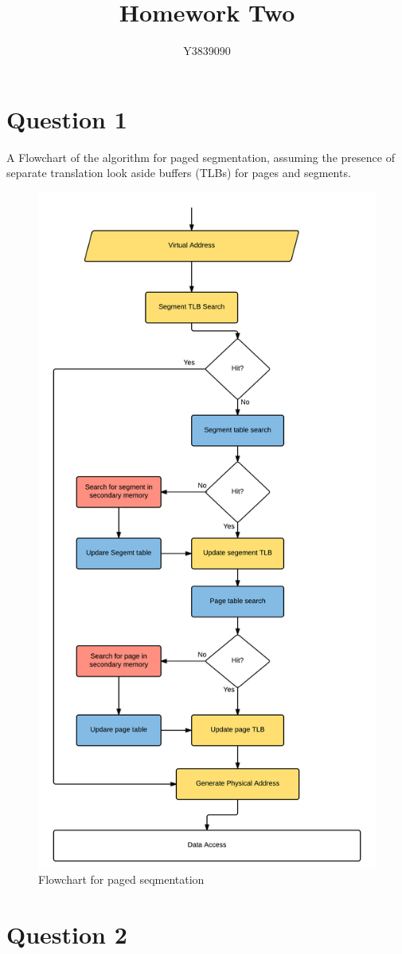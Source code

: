 \documentclass[11pt]{article}
\title{Homework Two}
\author{Y3839090}
\begin{document}
  \maketitle

  \tableofcontents %
  \listoffigures %
  \newpage

  \section{Question 1}
    A Flowchart of the algorithm for paged segmentation, assuming the presence of separate translation look aside buffers (TLBs) for pages and segments.
    \begin{figure}[ht]
      \centering
      \includegraphics[height=1\textwidth]{Paged_Segmentation_Flowchart.png}
      \caption{Flowchart for paged seqmentation}
    \end{figure}

  \newpage
  \section{Question 2}
  
\end{document}
